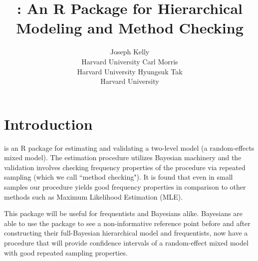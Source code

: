 \documentclass[article]{jss}
\author{Joseph Kelly\\Harvard University \And 
             Carl Morris\\ Harvard University\And
             Hyungsuk Tak\\Harvard University }
\title{\pkg{Rgbp}: An R Package for Hierarchical Modeling and Method Checking}
\begin{document}

\section[introduction]{Introduction}
 is an R package for estimating and validating a two-level model (a random-effects mixed model). The estimation procedure utilizes Bayesian machinery and the validation involves checking frequency properties of the procedure via repeated sampling (which we call ``method checking"). It is found that even in small samples our procedure yields good frequency properties in comparison to other methods such as Maximum Likelihood Estimation (MLE). 

This package will be useful for frequentists and Bayesians alike. Bayesians are able to use the package to see a non-informative reference point before and after constructing their full-Bayesian hierarchical model and frequentists, now have a procedure that will provide confidence intervals of a random-effect mixed model with good repeated sampling properties.


\end{document}
